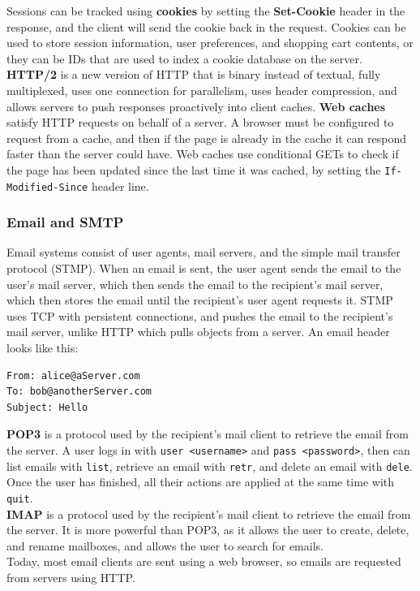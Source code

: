 Sessions can be tracked using \textbf{cookies} by setting the \textbf{Set-Cookie} header in the response, and the client will send the cookie back in the request. Cookies can be used to store session information, user preferences, and shopping cart contents, or they can be IDs that are used to index a cookie database on the server.\\
\textbf{HTTP/2} is a new version of HTTP that is binary instead of textual, fully multiplexed, uses one connection for parallelism, uses header compression, and allows servers to push responses proactively into client caches.
\textbf{Web caches} satisfy HTTP requests on behalf of a server. A browser must be configured to request from a cache, and then if the page is already in the cache it can respond faster than the server could have. Web caches use conditional GETs to check if the page has been updated since the last time it was cached, by setting the \verb|If-Modified-Since| header line.\\

\subsubsection{Email and SMTP}
Email systems consist of user agents, mail servers, and the simple mail transfer protocol (STMP). When an email is sent, the user agent sends the email to the user's mail server, which then sends the email to the recipient's mail server, which then stores the email until the recipient's user agent requests it. STMP uses TCP with persistent connections, and pushes the email to the recipient's mail server, unlike HTTP which pulls objects from a server. An email header looks like this:
\begin{verbatim}
From: alice@aServer.com
To: bob@anotherServer.com
Subject: Hello
\end{verbatim}
\textbf{POP3} is a protocol used by the recipient's mail client to retrieve the email from the server. A user logs in with \verb|user <username>| and \verb|pass <password>|, then can list emails with \verb|list|, retrieve an email with \verb|retr|, and delete an email with \verb|dele|. Once the user has finished, all their actions are applied at the same time with \verb|quit|.\\
\textbf{IMAP} is a protocol used by the recipient's mail client to retrieve the email from the server. It is more powerful than POP3, as it allows the user to create, delete, and rename mailboxes, and allows the user to search for emails.\\
Today, most email clients are sent using a web browser, so emails are requested from servers using HTTP.

